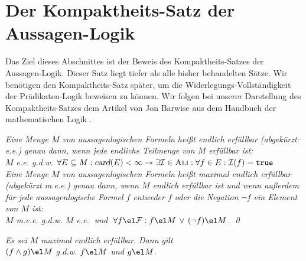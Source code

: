 \section{Der Kompaktheits-Satz der Aussagen-Logik}
Das Ziel dieses Abschnittes ist der Beweis des Kompaktheits-Satzes der Aussagen-Logik.  
Dieser Satz liegt tiefer als alle bisher behandelten Sätze.  Wir benötigen den Kompaktheits-Satz
später, um die Widerlegungs-Vollständigkeit der Prädikaten-Logik beweisen zu können.
Wir folgen bei unserer Darstellung des Kompaktheits-Satzes dem Artikel von Jon Barwise
\cite{barwise:1991a} aus dem Handbuch der mathematischen Logik \cite{barwise:1991}.

\begin{Definition}
  {\em Eine Menge $M$ von aussagenlogischen Formeln heißt \emph{endlich erfüllbar} (abgekürzt: e.e.) genau
    dann, wenn jede endliche Teilmenge von $M$ erfüllbar ist:
    \\[0.2cm]
    \hspace*{1.3cm} 
    $M$ e.e. \quad g.d.w. \quad 
    $\forall E \subseteq M: \textsl{card}(E) < \infty \rightarrow 
    \exists \mathcal{I} \in \textsc{Ali}: \forall f \in E: \mathcal{I}(f) = \mathtt{true}$
    \\[0.2cm]
    Eine Menge $M$ von aussagenlogischen Formeln heißt \emph{maximal endlich erfüllbar}
    (abgekürzt m.e.e.) genau dann, wenn $M$ endlich erfüllbar ist und wenn außerdem für
    jede aussagenlogische Formel $f$ entweder $f$ oder die Negation $\neg f$ ein Element von $M$ ist:
    \\[0.2cm]
    \hspace*{1.3cm}
    $M$ m.e.e. \quad g.d.w. \quad 
    $M$ e.e.$\;$ und $\;\forall f \el \mathcal{F}: f \el M \,\vee\, (\neg f) \el M$. \qed
  }
\end{Definition}

\begin{Satz} \label{satz28}
{\em
  Es sei $M$ maximal endlich erfüllbar.  Dann gilt 
  \\[0.2cm]
  \hspace*{1.3cm}
  $(f \wedge g) \el M$ \quad g.d.w. \quad $f \el M$ und $g \el M$.
}
\end{Satz}

